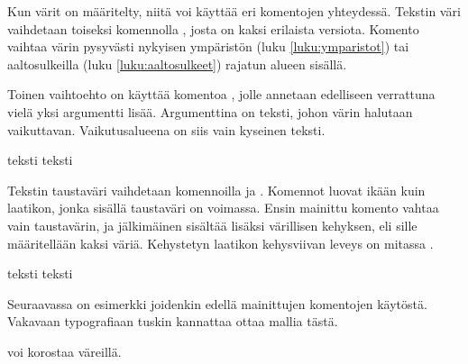 Kun värit on määritelty, niitä voi käyttää eri komentojen yhteydessä.
Tekstin väri vaihdetaan toiseksi komennolla , josta on
kaksi erilaista versiota. Komento vaihtaa värin pysyvästi nykyisen
ympäristön (luku \ref{luku:ymparistot}) tai aaltosulkeilla (luku
\ref{luku:aaltosulkeet}) rajatun alueen sisällä.

\begin{koodilohkosis}
\color{nimi}                  %
\color[värimalli]{parametrit} %
\end{koodilohkosis}

Toinen vaihtoehto on käyttää komentoa , jolle
annetaan edelliseen verrattuna vielä yksi argumentti lisää. Argumenttina
on teksti, johon värin halutaan vaikuttavan. Vaikutusalueena on siis
vain kyseinen teksti.

\begin{koodilohkosis}
\textcolor{nimi}{teksti}
\textcolor[värimalli]{parametrit}{teksti}
\end{koodilohkosis}

Tekstin taustaväri vaihdetaan komennoilla  ja
. Komennot luovat ikään kuin laatikon, jonka sisällä
taustaväri on voimassa. Ensin mainittu komento vahtaa vain taustavärin,
ja jälkimäinen sisältää lisäksi värillisen kehyksen, eli sille
määritellään kaksi väriä. Kehystetyn laatikon kehysviivan leveys on
mitassa .

\begin{koodilohkosis}
\colorbox{nimi}{teksti} %
\colorbox[värimalli]{parametrit}{teksti}
\end{koodilohkosis}

Seuraavassa on esimerkki joidenkin edellä mainittujen komentojen
käytöstä. Vakavaan typografiaan tuskin kannattaa ottaa mallia tästä.

\begin{koodilohkosis}
 \setlength{\fboxrule}{2bp}
\textcolor{pun}{voi korostaa} \colorbox{pun}{väreillä}.
\end{koodilohkosis}

